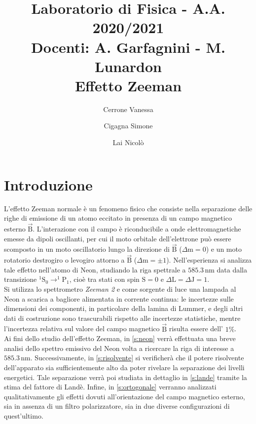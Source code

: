 \documentclass[twocolumn,10pt]{asme2ej}
\date{}
\title{{\huge\bfseries Laboratorio di Fisica} - {\LARGE A.A. 2020/2021} \\ 
    {\LARGE Docenti: A. Garfagnini - M. Lunardon} \\ {\Huge\bfseries Effetto Zeeman}}
\author{Cerrone Vanessa
    \affiliation{
    1200361\\
    vanessa.cerrone@studenti.unipd.it
    }	
}
\author{Cigagna Simone
    \affiliation{
	1193992\\
    simone.cigagna@studenti.unipd.it
    }	
}
\author{Lai Nicolò
    \affiliation{
	1193976\\
    nicolo.lai@studenti.unipd.it
    }	
}
\begin{document}
\maketitle    


\section{Introduzione}\label{s:introduzione}

L'effetto Zeeman normale è un fenomeno fisico che consiste nella separazione delle righe di emissione di un atomo
eccitato in presenza di un campo magnetico esterno $\vec{\text{B}}$. L'interazione con il campo è riconducibile a onde
elettromagnetiche emesse da dipoli oscillanti, per cui il moto orbitale dell'elettrone può essere scomposto in un moto
oscillatorio lungo la direzione di $\vec{\text{B}}$ ($\Delta \text{m} = 0$) e un moto rotatorio destrogiro o levogiro
attorno a $\vec{\text{B}}$ ($\Delta \text{m} = \pm1$). Nell'esperienza si analizza tale effetto nell'atomo di Neon,
studiando la riga spettrale a $585.3 \,\si{\nano\metre}$ data dalla transizione $^1\text{S}_0 \rightarrow ^1\text{P}_1$,
cioè tra stati con spin $\text{S} = 0$ e $\Delta \text{L}= \Delta \text{J} = 1$. \\
Si utilizza lo spettrometro \textit{Zeeman 2} e come sorgente di luce una lampada al Neon a scarica a bagliore
alimentata in corrente continua: le incertezze sulle dimensioni dei componenti, in particolare della lamina di Lummer, e
degli altri dati di costruzione sono trascurabili rispetto alle incertezze statistiche, mentre l'incertezza relativa sul
valore del campo magnetico $\vec{\text{B}}$ risulta essere dell' $1\%$.   \\

Ai fini dello studio dell'effetto Zeeman, in \autoref{s:neon} verrà effettuata una breve analisi dello spettro emissivo
del Neon volta a ricercare la riga di interesse a $585.3 \,\si{\nano\metre}$. Successivamente, in \autoref{s:risolvente}
si verificherà che il potere risolvente dell'apparato sia sufficientemente alto da poter rivelare la separazione dei
livelli energetici. Tale separazione verrà poi studiata in dettaglio in \autoref{s:lande} tramite la stima del fattore
di Landè. Infine, in \autoref{s:ortogonale} verranno analizzati qualitativamente gli effetti dovuti all'orientazione del
campo magnetico esterno, sia in assenza di un filtro polarizzatore, sia in due diverse configurazioni di quest'ultimo.
\end{document}
